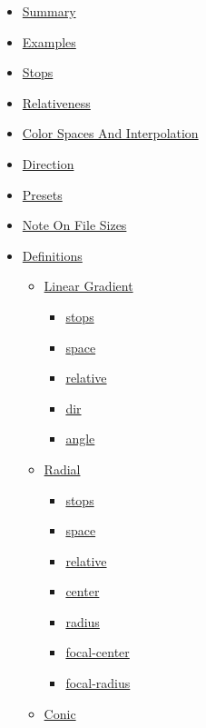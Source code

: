 \begin{itemize}
\tightlist
\item
  \hyperref[summary]{Summary}
\item
  \hyperref[examples]{Examples}
\item
  \hyperref[stops]{Stops}
\item
  \hyperref[relativeness]{Relativeness}
\item
  \hyperref[color-spaces-and-interpolation]{Color Spaces And
  Interpolation}
\item
  \hyperref[direction]{Direction}
\item
  \hyperref[presets]{Presets}
\item
  \hyperref[note-on-file-sizes]{Note On File Sizes}
\item
  \hyperref[definitions]{Definitions}

  \begin{itemize}
  \tightlist
  \item
    \hyperref[definitions-linear]{Linear Gradient}

    \begin{itemize}
    \tightlist
    \item
      \hyperref[definitions-linear-stops]{stops}
    \item
      \hyperref[definitions-linear-space]{space}
    \item
      \hyperref[definitions-linear-relative]{relative}
    \item
      \hyperref[definitions-linear-dir]{dir}
    \item
      \hyperref[definitions-linear-angle]{angle}
    \end{itemize}
  \item
    \hyperref[definitions-radial]{Radial}

    \begin{itemize}
    \tightlist
    \item
      \hyperref[definitions-radial-stops]{stops}
    \item
      \hyperref[definitions-radial-space]{space}
    \item
      \hyperref[definitions-radial-relative]{relative}
    \item
      \hyperref[definitions-radial-center]{center}
    \item
      \hyperref[definitions-radial-radius]{radius}
    \item
      \hyperref[definitions-radial-focal-center]{focal-center}
    \item
      \hyperref[definitions-radial-focal-radius]{focal-radius}
    \end{itemize}
  \item
    \hyperref[definitions-conic]{Conic}


\end{itemize}
\end{itemize}
